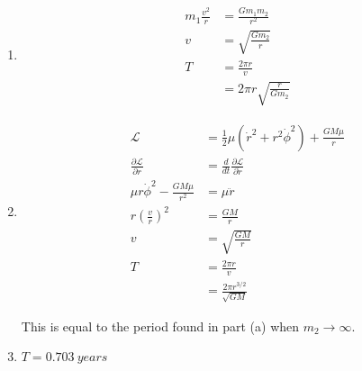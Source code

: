 \documentclass{article}
\begin{document}
\begin{enumerate}
  \item

        \begin{align*}
          m_1 \frac{v^2}{r} & = \frac{G m_1 m_2}{r^2}          \\
          v                 & = \sqrt{\frac{G m_2}{r}}         \\
          T                 & = \frac{2 \pi r}{v}              \\
                            & = 2 \pi r \sqrt{\frac{r}{G m_2}}
        \end{align*}

  \item

        \begin{align*}
          \mathcal{L}                              & = \frac{1}{2} \mu (\dot{r}^2 + r^2 \dot{\phi}^2) + \frac{G M \mu}{r} \\
          \frac{\partial \mathcal{L}}{\partial r}  & = \frac{d}{d t} \frac{\partial \mathcal{L}}{\partial \dot{r}}        \\
          \mu r \dot{\phi}^2 - \frac{G M \mu}{r^2} & = \mu \ddot{r}                                                       \\
          r \left( \frac{v}{r} \right)^2           & = \frac{G M}{r}                                                      \\
          v                                        & = \sqrt{\frac{G M}{r}}                                               \\
          T                                        & = \frac{2 \pi r}{v}                                                  \\
                                                   & = \frac{2 \pi r^{3 / 2}}{\sqrt{G M}}
        \end{align*}

        This is equal to the period found in part (a) when $m_2 \rightarrow \infty$.

  \item $T = \qty{0.703}{years}$
\end{enumerate}

\setcounter{subsection}{8}
\subsection{}
\end{document}
